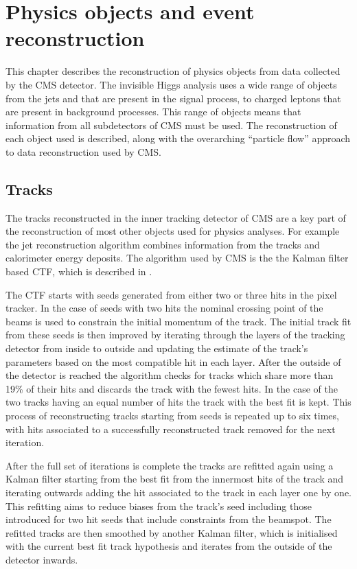 \chapter{Physics objects and event reconstruction}
\label{chap:obj}
This chapter describes the reconstruction of physics objects from data collected by the CMS detector. The invisible Higgs analysis uses a wide range of objects from the jets and \MET that are present in the signal process, to charged leptons that are present in background processes. This range of objects means that information from all subdetectors of CMS must be used. The reconstruction of each object used is described, along with the overarching ``particle flow'' approach to data reconstruction used by CMS.

\section{Tracks}
\label{sec:tracks}
The tracks reconstructed in the inner tracking detector of CMS are a key part of the reconstruction of most other objects used for physics analyses. For example the jet reconstruction algorithm combines information from the tracks and calorimeter energy deposits. The algorithm used by CMS is the the Kalman filter based \ac{CTF}, which is described in  \cite{1748-0221-9-10-P10009}. 

The \ac{CTF} starts with seeds generated from either two or three hits in the pixel tracker. In the case of seeds with two hits the nominal crossing point of the beams is used to constrain the initial momentum of the track. The initial track fit from these seeds is then improved by iterating through the layers of the tracking detector from inside to outside and updating the estimate of the track's parameters based on the most compatible hit in each layer. After the outside of the detector is reached the algorithm checks for tracks which share more than 19\% of their hits and discards the track with the fewest hits. In the case of the two tracks having an equal number of hits the track with the best fit is kept. This process of reconstructing tracks starting from seeds is repeated up to six times, with hits associated to a successfully reconstructed track removed for the next iteration. 

After the full set of iterations is complete the tracks are refitted again using a Kalman filter starting from the best fit from the innermost hits of the track and iterating outwards adding the hit associated to the track in each layer one by one. This refitting aims to reduce biases from the track's seed including those introduced for two hit seeds that include constraints from the beamspot. The refitted tracks are then smoothed by another Kalman filter, which is initialised with the current best fit track hypothesis and iterates from the outside of the detector inwards. 

